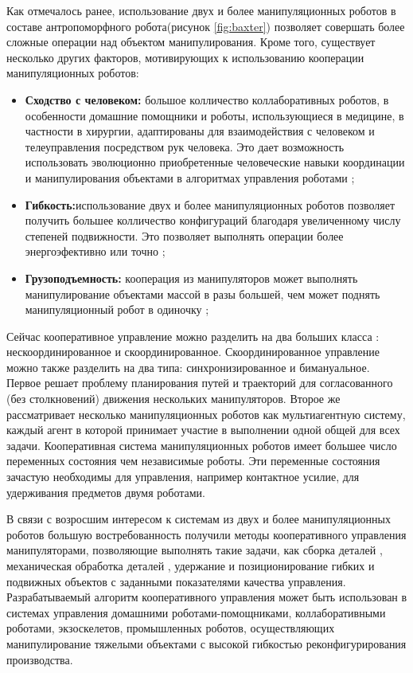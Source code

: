 Как отмечалось ранее, использование двух и более манипуляционных роботов в составе антропоморфного робота(рисунок \ref{fig:baxter}) позволяет совершать более сложные операции над объектом манипулирования. Кроме того, существует несколько других факторов, мотивирующих к использованию кооперации манипуляционных роботов:
\begin{itemize}
  \item \textbf{Сходство с человеком:} большое колличество коллаборативных роботов, в особенности домашние помощники и роботы, использующиеся в медицине, в частности в хирургии, адаптированы для взаимодействия с человеком и телеуправления посредством рук человека. Это дает возможность использовать эволюционно приобретенные человеческие навыки координации и манипулирования объектами в алгоритмах управления роботами \cite{coop_manipulator_survey};
  \item \textbf{Гибкость:}использование двух и более манипуляционных роботов позволяет получить большее колличество конфигураций благодаря увеличенному числу степеней подвижности. Это позволяет выполнять операции более энергоэфективно \cite{Ajoudani2017} или точно \cite{Faroni2016};
  \item \textbf{Грузоподъемность:} кооперация из манипуляторов может выполнять манипулирование объектами массой в разы большей, чем может поднять манипуляционный робот в одиночку \cite{AzizZadeh2019};
\end{itemize}

 Сейчас кооперативное управление можно разделить на два больших класса \cite{coop_manipulator_survey}: нескоординированное и скоординированное. Скоординированное управление можно также разделить на два типа: синхронизированное и бимануальное. Первое решает проблему планирования путей и траекторий для согласованного (без столкновений) движения нескольких манипуляторов. Второе же рассматривает несколько манипуляционных роботов как мультиагентную систему, каждый агент в которой принимает участие в выполнении одной общей для всех задачи. Кооперативная система манипуляционных роботов имеет большее число переменных состояния чем независимые роботы. Эти переменные состояния зачастую необходимы для управления, например контактное усилие, для удерживания предметов двумя роботами.

В связи с возросшим интересом к системам из двух и более манипуляционных роботов большую востребованность получили методы кооперативного управления манипуляторами, позволяющие выполнять такие задачи, как сборка деталей \cite{Sun2002}, механическая обработка деталей \cite{AzizZadeh2019}, удержание и позиционирование гибких и подвижных объектов \cite{Pfeffer1993} с заданными показателями качества управления. Разрабатываемый алгоритм кооперативного управления может быть использован в системах управления домашними роботами-помощниками, коллаборативными роботами, экзоскелетов, промышленных роботов, осуществляющих манипулирование тяжелыми объектами с высокой гибкостью реконфигурирования производства.

